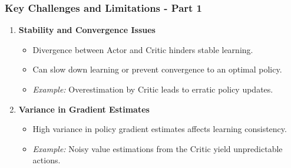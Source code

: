 \documentclass[aspectratio=169]{beamer}
\begin{document}
\begin{frame}[fragile]
    \frametitle{Key Challenges and Limitations - Part 1}

    \begin{enumerate}
        \item \textbf{Stability and Convergence Issues}
        \begin{itemize}
            \item Divergence between Actor and Critic hinders stable learning.
            \item Can slow down learning or prevent convergence to an optimal policy.
            \item \textit{Example:} Overestimation by Critic leads to erratic policy updates.
        \end{itemize}

        \item \textbf{Variance in Gradient Estimates}
        \begin{itemize}
            \item High variance in policy gradient estimates affects learning consistency.
            \item \textit{Example:} Noisy value estimations from the Critic yield unpredictable actions.
        \end{itemize}
    \end{enumerate}
    
\end{frame}
\end{document}
